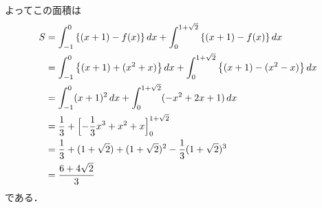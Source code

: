 \documentclass[../../main.tex]{subfiles}
\begin{document}
よってこの面積は
\begin{align}
  S
  &=\int_{-1}^0\left\{(x+1)-f(x)\right\}dx+\int_0^{1+\sqrt{2}}\left\{(x+1)-f(x)\right\}dx\\
  &=\int_{-1}^0\left\{(x+1)+(x^2+x)\right\}dx+\int_0^{1+\sqrt{2}}\left\{(x+1)-(x^2-x)\right\}dx\\
  &=\int_{-1}^0(x+1)^2\,dx+\int_0^{1+\sqrt{2}}(-x^2+2x+1)\,dx\\
  &=\dfrac{1}{3}+\Bigl[-\dfrac{1}{3}x^3+x^2+x\Bigr]_0^{1+\sqrt{2}}\\
  &=\dfrac{1}{3}+(1+\sqrt{2})+(1+\sqrt{2})^2-\dfrac{1}{3}(1+\sqrt{2})^3\\
  &=\dfrac{6+4\sqrt{2}}{3}
\end{align}
である．

\newpage
\end{document}
